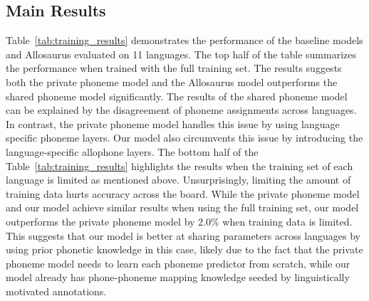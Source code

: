 \documentclass{article}
\begin{document}
\subsection{Main Results}


Table~\ref{tab:training_results} demonstrates the performance of the baseline models and Allosaurus evaluated on 11 languages. The top half of the table summarizes the performance when trained with the full training set. The results suggests both the private phoneme model and the Allosaurus model outperforms the shared phoneme model significantly. The results of the shared phoneme model can be explained by the disagreement of phoneme assignments across languages. In contrast, the private phoneme model handles this issue by using language specific phoneme layers. Our model also circumvents this issue by introducing the language-specific allophone layers. The bottom half of the Table~\ref{tab:training_results} highlights the results when the training set of each language is limited as mentioned above. Unsurprisingly, limiting the amount of training data hurts accuracy across the board. While the private phoneme model and our model achieve similar results when using the full training set, our model outperforms the private phoneme model by 2.0\% when training data is limited. This suggests that our model is better at sharing parameters across languages by using prior phonetic knowledge in this case, likely due to the fact that the private phoneme model needs to learn each phoneme predictor from scratch, while our model already has phone-phoneme mapping knowledge seeded by linguistically motivated annotations.
\end{document}
